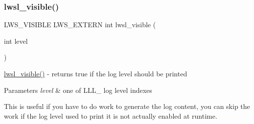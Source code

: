 \subsubsection{\texorpdfstring{lwsl\+\_\+visible()}{lwsl\_visible()}}
{\footnotesize\ttfamily L\+W\+S\+\_\+\+V\+I\+S\+I\+B\+LE L\+W\+S\+\_\+\+E\+X\+T\+E\+RN int lwsl\+\_\+visible (\begin{DoxyParamCaption}\item[{int}]{level }\end{DoxyParamCaption})}

\hyperlink{group__log_ga2d1819ad1645062fd83817e6f20e03b4}{lwsl\+\_\+visible()} -\/ returns true if the log level should be printed


\begin{DoxyParams}{Parameters}
{\em level} & one of L\+L\+L\+\_\+ log level indexes\\
\hline
\end{DoxyParams}
This is useful if you have to do work to generate the log content, you can skip the work if the log level used to print it is not actually enabled at runtime. 